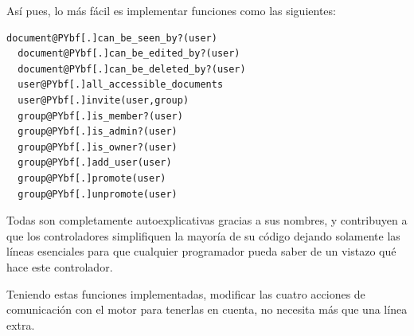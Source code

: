 Así pues, lo más fácil es implementar funciones como las siguientes:

\begin{Verbatim}[commandchars=@\[\]]
  document@PYbf[.]can_be_seen_by?(user)
  document@PYbf[.]can_be_edited_by?(user)
  document@PYbf[.]can_be_deleted_by?(user)
  user@PYbf[.]all_accessible_documents
  user@PYbf[.]invite(user,group)
  group@PYbf[.]is_member?(user)
  group@PYbf[.]is_admin?(user)
  group@PYbf[.]is_owner?(user)
  group@PYbf[.]add_user(user)
  group@PYbf[.]promote(user)
  group@PYbf[.]unpromote(user)
\end{Verbatim}



Todas son completamente autoexplicativas gracias a sus nombres, y contribuyen a que los controladores simplifiquen la mayoría de su código dejando solamente las líneas esenciales para que cualquier programador pueda saber de un vistazo qué hace este controlador.

Teniendo estas funciones implementadas, modificar las cuatro acciones de comunicación con el motor para tenerlas en cuenta, no necesita más que una línea extra.


